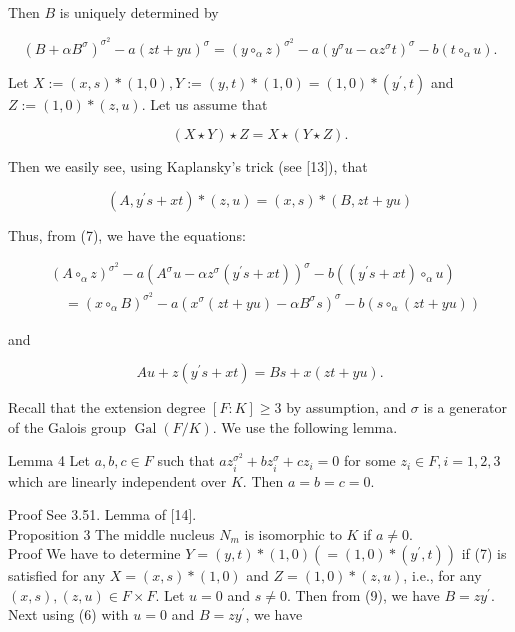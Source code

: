 \documentclass[10pt]{article}
\begin{document}
Then $B$ is uniquely determined by


\begin{equation*}
\left(B+\alpha B^{\sigma}\right)^{\sigma^{2}}-a(z t+y u)^{\sigma}=\left(y \circ_{\alpha} z\right)^{\sigma^{2}}-a\left(y^{\sigma} u-\alpha z^{\sigma} t\right)^{\sigma}-b\left(t \circ_{\alpha} u\right) . \tag{6}
\end{equation*}


Let $X:=(x, s) *(1,0), Y:=(y, t) *(1,0)=(1,0) *\left(y^{\prime}, t\right)$ and $Z:=(1,0) *(z, u)$. Let us assume that


\begin{equation*}
(X \star Y) \star Z=X \star(Y \star Z) . \tag{7}
\end{equation*}


Then we easily see, using Kaplansky's trick (see [13]), that

$$
\left(A, y^{\prime} s+x t\right) *(z, u)=(x, s) *(B, z t+y u)
$$

Thus, from (7), we have the equations:


\begin{align*}
& \left(A \circ_{\alpha} z\right)^{\sigma^{2}}-a\left(A^{\sigma} u-\alpha z^{\sigma}\left(y^{\prime} s+x t\right)\right)^{\sigma}-b\left(\left(y^{\prime} s+x t\right) \circ_{\alpha} u\right) \\
& \quad=\left(x \circ_{\alpha} B\right)^{\sigma^{2}}-a\left(x^{\sigma}(z t+y u)-\alpha B^{\sigma} s\right)^{\sigma}-b\left(s \circ_{\alpha}(z t+y u)\right) \tag{8}
\end{align*}


and


\begin{equation*}
A u+z\left(y^{\prime} s+x t\right)=B s+x(z t+y u) . \tag{9}
\end{equation*}


Recall that the extension degree $[F: K] \geq 3$ by assumption, and $\sigma$ is a generator of the Galois group $\operatorname{Gal}(F / K)$. We use the following lemma.

Lemma 4 Let $a, b, c \in F$ such that $a z_{i}^{\sigma^{2}}+b z_{i}^{\sigma}+c z_{i}=0$ for some $z_{i} \in F, i=1,2,3$ which are linearly independent over $K$. Then $a=b=c=0$.

Proof See 3.51. Lemma of [14].\\
Proposition 3 The middle nucleus $N_{m}$ is isomorphic to $K$ if $a \neq 0$.\\
Proof We have to determine $Y=(y, t) *(1,0)\left(=(1,0) *\left(y^{\prime}, t\right)\right)$ if (7) is satisfied for any $X=(x, s) *(1,0)$ and $Z=(1,0) *(z, u)$, i.e., for any $(x, s),(z, u) \in F \times F$. Let $u=0$ and $s \neq 0$. Then from (9), we have $B=z y^{\prime}$. Next using (6) with $u=0$ and $B=z y^{\prime}$, we have
\end{document}
